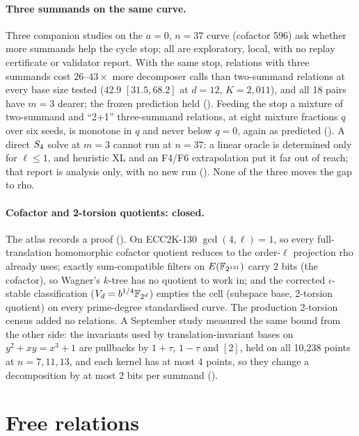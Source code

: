 \paragraph{Three summands on the same curve.} Three companion studies on the
$a=0$, $n=37$ curve (cofactor 596) ask whether more summands help the
cycle stop; all are exploratory, local, with no replay certificate or
validator report. With the same stop, relations with three summands cost
$26$--$43\times$ more decomposer calls than two-summand relations at every
base size tested ($42.9$ $[31.5,68.2]$ at $d=12$, $K=2{,}011$), and all 18
pairs have $m=3$ dearer; the frozen prediction held
(). Feeding the stop a
mixture of two-summand and ``2+1'' three-summand relations, at eight
mixture fractions $q$ over six seeds, is monotone in $q$ and never below
$q=0$, again as predicted ().
A direct $S_{4}$ solve at $m=3$ cannot run at $n=37$: a linear oracle is
determined only for $\ell\le1$, and heuristic XL and an F4/F6 extrapolation
put it far out of reach; that report is analysis only, with no new run
(). None of the three moves
the gap to rho.

\paragraph{Cofactor and 2-torsion quotients: closed.} The atlas records a
proof ().
On ECC2K-130 $\gcd(4,\ell)=1$, so every full-translation homomorphic
cofactor quotient reduces to the order-$\ell$ projection rho already uses;
exactly sum-compatible filters on $E(\mathbb{F}_{2^{131}})$ carry 2 bits (the
cofactor), so Wagner's $k$-tree has no quotient to work in; and the
corrected $\iota$-stable classification ($V_d=b^{1/4}\mathbb{F}_{2^d}$) empties the
cell (subspace base, 2-torsion quotient) on every prime-degree standardised
curve. The production 2-torsion census added no relations. A September
study measured the same bound from the other side: the invariants used by
translation-invariant bases on $y^2+xy=x^3+1$ are pullbacks by $1+\tau$,
$1-\tau$ and $[2]$, held on all 10{,}238 points at $n=7,11,13$, and each
kernel has at most 4 points, so they change a decomposition by at most 2
bits per summand ().

\section{Free relations}\label{sec:kc-free}

